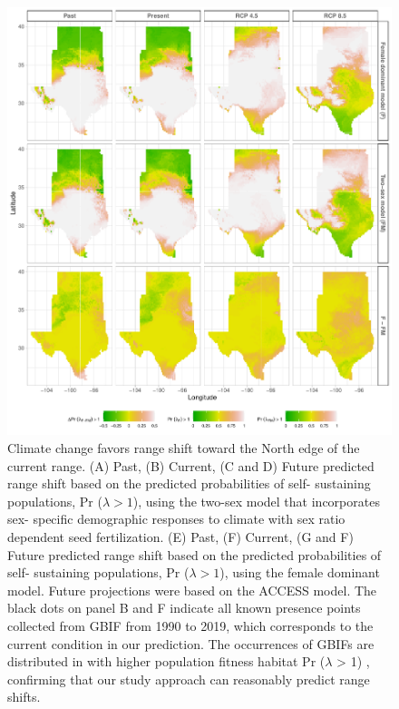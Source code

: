 \documentclass[12pt]{article}
\begin{document}
\begin{figure}[H]
  \begin{center}
    \includegraphics[width=0.95\linewidth]{Figures/Fig_geoPrlambdaacc.pdf}
  \caption{Climate change favors range shift toward the North edge of the current range.
  (A) Past, (B) Current, (C and D) Future predicted range shift based on the predicted probabilities of self- sustaining populations, Pr ($\lambda > 1$), using the two-sex model that incorporates sex- specific demographic responses to climate with sex ratio dependent seed fertilization.
  (E) Past, (F) Current, (G and F) Future  predicted range shift based on the predicted probabilities of self- sustaining populations, Pr ($\lambda > 1$), using the female dominant model.
  Future projections were based on the  ACCESS model.
  The black dots on panel B and F indicate all known presence points collected from GBIF from 1990 to 2019, which corresponds to the current condition in our prediction. 
  The occurrences of GBIFs are distributed in with higher population fitness habitat Pr ($\lambda$ > 1) , confirming that our study approach can reasonably predict range shifts.}
  \label{Sup:geoprojcmc}
  \end{center}
\end{figure}
\end{document}
